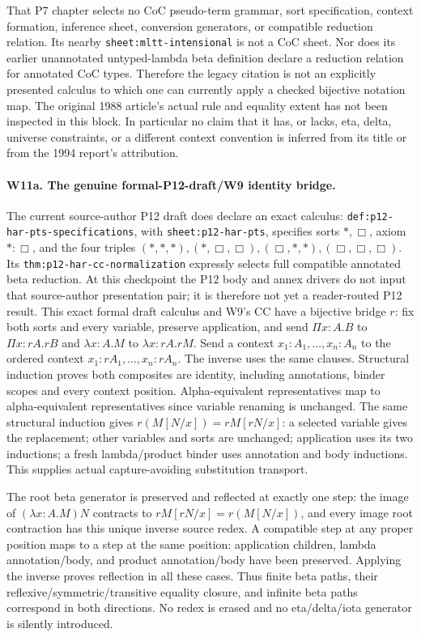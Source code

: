 That P7 chapter selects no CoC pseudo-term grammar, sort specification,
context formation, inference sheet, conversion generators, or compatible
reduction relation. Its nearby \texttt{sheet:mltt-intensional} is not a
CoC sheet. Nor does its earlier unannotated untyped-lambda beta definition
declare a reduction relation for annotated CoC types. Therefore the
legacy citation is not an explicitly presented calculus to which one
can currently apply a checked bijective notation map. The original
1988 article's actual rule and equality extent has not been inspected
in this block. In particular no claim that it has, or lacks, eta, delta,
universe constraints, or a different context convention is inferred
from its title or from the 1994 report's attribution.

\paragraph{W11a. The genuine formal-P12-draft/W9 identity bridge.}
The current source-author P12 draft does declare an exact calculus:
\texttt{def:p12-har-pts-specifications}, with
\texttt{sheet:p12-har-pts}, specifies sorts \(\ast,\Box\), axiom
\(\ast:\Box\), and the four triples
\((\ast,\ast,\ast),(\ast,\Box,\Box),
(\Box,\ast,\ast),(\Box,\Box,\Box)\).
Its \texttt{thm:p12-har-cc-normalization} expressly selects full
compatible annotated beta reduction. At this checkpoint the P12 body and
annex drivers do not input that source-author presentation pair; it is
therefore not yet a reader-routed P12 result. This exact formal draft calculus
and W9's CC have a bijective bridge \(r\): fix both sorts and every
variable, preserve application, and send
\(\Pi x:A.B\) to \(\Pi x:rA.rB\) and
\(\lambda x:A.M\) to \(\lambda x:rA.rM\).
Send a context \(x_1:A_1,\ldots,x_n:A_n\) to the ordered context
\(x_1:rA_1,\ldots,x_n:rA_n\). The inverse uses the same clauses.
Structural induction proves both composites are identity, including
annotations, binder scopes and every context position. Alpha-equivalent
representatives map to alpha-equivalent representatives since variable
renaming is unchanged. The same structural induction gives
\(r(M[N/x])=rM[rN/x]\): a selected variable gives the replacement;
other variables and sorts are unchanged; application uses its two
inductions; a fresh lambda/product binder uses annotation and body
inductions. This supplies actual capture-avoiding substitution transport.

The root beta generator is preserved and reflected at exactly one step:
the image of \((\lambda x:A.M)N\) contracts to
\(rM[rN/x]=r(M[N/x])\), and every image root contraction has this
unique inverse source redex. A compatible step at any proper position
maps to a step at the same position: application children, lambda
annotation/body, and product annotation/body have been preserved.
Applying the inverse proves reflection in all these cases. Thus finite
beta paths, their reflexive/symmetric/transitive equality closure, and
infinite beta paths correspond in both directions. No redex is erased
and no eta/delta/iota generator is silently introduced.

